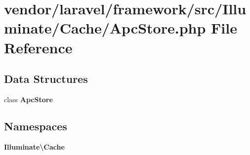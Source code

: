 \section{vendor/laravel/framework/src/\+Illuminate/\+Cache/\+Apc\+Store.php File Reference}
\label{_apc_store_8php}
\subsection*{Data Structures}
\begin{DoxyCompactItemize}
\item 
class {\bf Apc\+Store}
\end{DoxyCompactItemize}
\subsection*{Namespaces}
\begin{DoxyCompactItemize}
\item 
 {\bf Illuminate\textbackslash{}\+Cache}
\end{DoxyCompactItemize}
